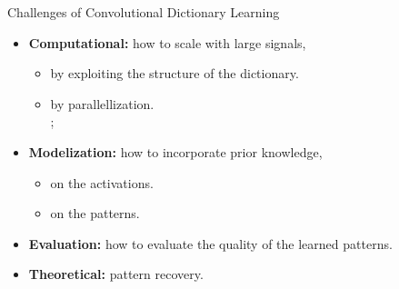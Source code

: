 \documentclass[main_dicodile]{subfiles}
\begin{document}


\begin{frame}[t]{Challenges of Convolutional Dictionary Learning}
    \begin{itemize}\itemsep1em
        \item \textbf{Computational:} how to scale with large signals,
        \begin{itemize}
            \item by exploiting the structure of the dictionary.\\
            \item {by parallellization.}\\
            ;
        \end{itemize}
        \item \textbf{Modelization:} how to incorporate prior knowledge,
        \begin{itemize}
            \item on the activations.\\
            \item on the patterns.\\
        \end{itemize}
        \item \textbf{Evaluation:} how to evaluate the quality of the learned patterns.
        \item \textbf{Theoretical:} pattern recovery.
    \end{itemize}
\end{frame}
\end{document}
